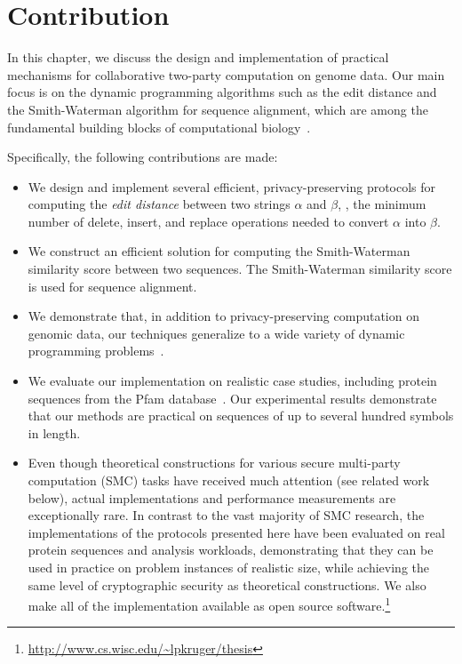 \section{Contribution}
In this chapter, we discuss the design and implementation of
practical mechanisms for
collaborative two-party computation on genome data.  Our main focus is
on the dynamic programming algorithms such as the edit distance and
the Smith-Waterman algorithm for sequence alignment, which are among
the fundamental building blocks of computational biology~\cite[Chapter
11]{Gusfield}.

Specifically, the following contributions are made:

\begin{itemize}

\item 
We design and implement several efficient, privacy-preserving protocols
for computing the \emph{edit distance} between two strings $\alpha$
and $\beta$, \ie, the minimum number of {\sf delete}, {\sf insert},
and {\sf replace} operations needed to convert $\alpha$ into $\beta$.

\item
We construct an efficient solution for computing the Smith-Waterman~\cite{Smith-Waterman}
similarity score between two sequences. The Smith-Waterman similarity score is used for
sequence alignment.

\item
We demonstrate that, in addition to privacy-preserving computation on
genomic data, our techniques generalize to a wide variety of dynamic
programming problems~\cite[Chapter 15]{CLR}.

\item
We evaluate our implementation on realistic case studies, including
protein sequences from the Pfam database~\cite{pfam2002}.  Our experimental results
demonstrate that our methods are practical on sequences of up to several
hundred symbols in length.

\item
Even though theoretical constructions for various secure multi-party
computation (SMC) tasks have received much attention (see related
work below), actual implementations and performance measurements
are exceptionally rare.  In contrast to the vast majority of
SMC research, the implementations of the protocols presented here have been
evaluated on real protein sequences and analysis workloads, demonstrating
that they can be used in practice on problem instances of realistic size,
while achieving the same level of cryptographic security as theoretical
constructions.  We also make all of the implementation available as open source
software.\footnote{\url{http://www.cs.wisc.edu/~lpkruger/thesis}}

\end{itemize}

